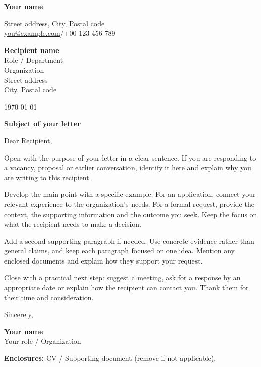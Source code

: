 \documentclass[11pt,a4paper]{article}
\makeatletter
\newcommand{\sendername}{Your name}
\newcommand{\senderrole}{Your role / Organization}
\newcommand{\senderemail}{you@example.com}
\newcommand{\lettersubject}{Subject of your letter}
\makeatother
\begin{document}
{\LARGE\bfseries\sendername}\par
\vspace{-3pt}{\small\sffamily\color{accent}\senderrole}\par
\vspace{2pt}
{\small\color{muted}Street address, City, Postal code\\
\href{mailto:\senderemail}{\senderemail}\quad /\quad +00 123 456 789}
\vspace{18pt}
\begin{minipage}[t]{0.62\linewidth}
\textbf{Recipient name}\\
Role / Department\\
Organization\\
Street address\\
City, Postal code
\end{minipage}\hfill
\begin{minipage}[t]{0.32\linewidth}\raggedleft
{\small\color{muted}\today}
\end{minipage}
\vspace{22pt}

{\large\bfseries\color{accent}\lettersubject}

Dear Recipient,

Open with the purpose of your letter in a clear sentence. If you are responding
to a vacancy, proposal or earlier conversation, identify it here and explain
why you are writing to this recipient.

Develop the main point with a specific example. For an application, connect
your relevant experience to the organization's needs. For a formal request,
provide the context, the supporting information and the outcome you seek.
Keep the focus on what the recipient needs to make a decision.

Add a second supporting paragraph if needed. Use concrete evidence rather than
general claims, and keep each paragraph focused on one idea. Mention any
enclosed documents and explain how they support your request.

Close with a practical next step: suggest a meeting, ask for a response by an
appropriate date or explain how the recipient can contact you. Thank them for
their time and consideration.

\vspace{5pt}
Sincerely,

\vspace{18pt}
\textbf{\sendername}\\
{\small\color{muted}\senderrole}

\vfill
{\small\color{muted}\textbf{Enclosures:} CV / Supporting document (remove if not applicable).}
\end{document}
